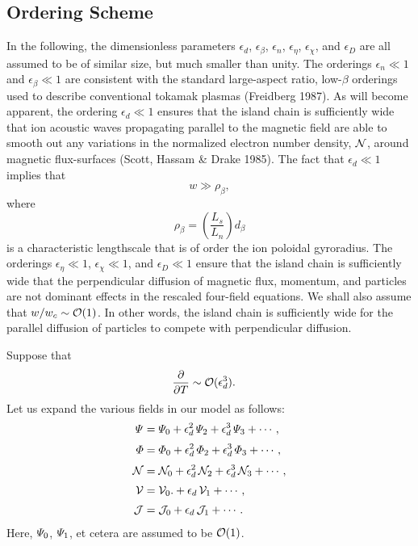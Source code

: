 \documentclass[notitlepage,12pt]{article}
\begin{document}
\subsection{Ordering Scheme}
In the following, the dimensionless parameters $\epsilon_d$, $\epsilon_\beta$, $\epsilon_n$, $\epsilon_\eta$, $\epsilon_\chi$,
and $\epsilon_D$ are all assumed to be of similar size, but much smaller than unity. The orderings $\epsilon_n\ll 1$ and $\epsilon_\beta\ll 1$
are consistent with the standard large-aspect ratio, low-$\beta$ orderings used to describe conventional tokamak
plasmas (Freidberg 1987). As will become apparent, the ordering $\epsilon_d\ll 1$ ensures that the island chain is
sufficiently wide that ion acoustic waves propagating parallel to the magnetic field are able to smooth out any
variations in the normalized electron number density, ${\cal N}$, around magnetic flux-surfaces (Scott, Hassam \& Drake 1985). The fact that $\epsilon_d\ll 1$ implies that
\begin{equation}
w \gg \rho_\beta,
\end{equation}
where
\begin{equation}
\rho_\beta = \left(\frac{L_s}{L_n}\right)d_\beta
\end{equation}
is a characteristic lengthscale that is of order the ion poloidal gyroradius. 
 The orderings $\epsilon_\eta\ll 1$, $\epsilon_\chi\ll 1$, and $\epsilon_D\ll 1$ ensure that the island
chain is sufficiently wide that the perpendicular diffusion of magnetic flux, momentum, and particles are not dominant
effects in the rescaled four-field equations. We shall also assume that $w/w_c\sim{\cal O}(1)$. In other words, the
island chain is sufficiently wide for the parallel diffusion of particles to compete with perpendicular diffusion. 

Suppose that 
\begin{align}
\frac{\partial}{\partial T}&\sim {\cal O}(\epsilon_d^3).
\end{align}
Let us expand the various fields in our model as follows:
\begin{align}
{\mit\Psi}&= {\mit\Psi}_0+\epsilon_d^2\,{\mit\Psi}_2+ \epsilon_d^3\,{\mit\Psi}_3 + \cdots,\label{e429}\\[0.5ex]
{\mit\Phi}&= {\mit\Phi}_0+\epsilon_d^2\,{\mit\Phi}_2+ \epsilon_d^3\,{\mit\Phi}_3 + \cdots,\\[0.5ex]
{\cal N}&= {\cal N}_0+\epsilon_d^2\,{\cal N}_2+ \epsilon_d^3\,{\cal N}_3 + \cdots,\label{e431}\\[0.5ex]
{\cal V} & ={\cal V}_0. +\epsilon_d\,{\cal V}_1 +\cdots,\\[0.5ex]
{\cal J} &= {\cal J}_0 + \epsilon_d\,{\cal J}_1 +\cdots. \label{e496}
\end{align}
Here, ${\mit\Psi}_0$, ${\mit\Psi}_1$, et cetera are assumed to be ${\cal O}(1)$. 
\end{document}
